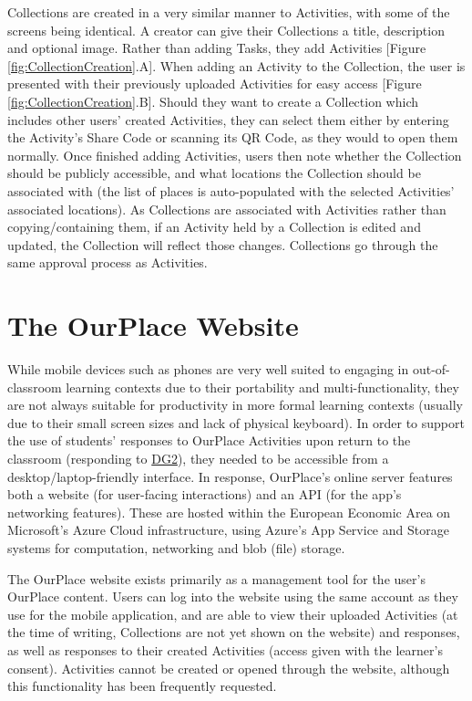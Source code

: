 Collections are created in a very similar manner to Activities, with some of the screens being identical. A creator can give their Collections a title, description and optional image. Rather than adding Tasks, they add Activities [Figure \ref{fig:CollectionCreation}.A]. When adding an Activity to the Collection, the user is presented with their previously uploaded Activities for easy access [Figure \ref{fig:CollectionCreation}.B]. Should they want to create a Collection which includes other users' created Activities, they can select them either by entering the Activity's Share Code or scanning its QR Code, as they would to open them normally. Once finished adding Activities, users then note whether the Collection should be publicly accessible, and what locations the Collection should be associated with (the list of places is auto-populated with the selected Activities' associated locations). As Collections are associated with Activities rather than copying/containing them, if an Activity held by a Collection is edited and updated, the Collection will reflect those changes. Collections go through the same approval process as Activities.

\section{The OurPlace Website}
\label{sec:ImplementationWeb}
While mobile devices such as phones are very well suited to engaging in out-of-classroom learning contexts due to their portability and multi-functionality, they are not always suitable for productivity in more formal learning contexts (usually due to their small screen sizes and lack of physical keyboard). In order to support the use of students' responses to OurPlace Activities upon return to the classroom (responding to \hyperref[DG2]{DG2}), they needed to be accessible from a desktop/laptop-friendly interface. In response, OurPlace's online server features both a website (for user-facing interactions) and an API (for the app's networking features). These are hosted within the European Economic Area on Microsoft's Azure Cloud infrastructure, using Azure's App Service and Storage systems for computation, networking and blob (file) storage.

The OurPlace website exists primarily as a management tool for the user's OurPlace content. Users can log into the website using the same account as they use for the mobile application, and are able to view their uploaded Activities (at the time of writing, Collections are not yet shown on the website) and responses, as well as responses to their created Activities (access given with the learner's consent). Activities cannot be created or opened through the website, although this functionality has been frequently requested. 


